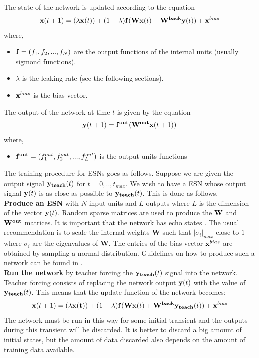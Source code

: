 \documentclass[letterpaper,9pt]{article}
\begin{document}
The state of the network is updated according to the equation
\begin{equation}
{\bf x}(t+1)= (\lambda {\bf x}(t)) + (1-\lambda){\bf f}({\bf Wx}(t) + {\bf W^{back}y}(t)) + {\bf x}^{bias}
\end{equation}
where,
\begin{itemize}
  \item ${\bf f}=(f_1,f_2,...,f_N)$ are the output functions of the internal units (usually sigmond functions).
  \item $\lambda$ is the leaking rate (see the following sections).
  \item ${\bf x}^{bias}$ is the bias vector.
\end{itemize}
The output of the network at time $t$ is given by the equation
\begin{equation}
  {\bf y}(t+1)={\bf f^{out}}({\bf W^{out}}{\bf x}(t+1))
\end{equation}
where,
\begin{itemize}
  \item ${\bf f^{out}}=(f_1^{out},f_2^{out},...,f_L^{out})$ is the output units functions
\end{itemize}
The training procedure for ESNs goes as follows. Suppose we are given the output signal ${\bf y_{teach}}(t)$ for $t=0,..,t_{max}$. We wish to have a ESN whose output signal ${\bf y}(t)$ is as close as possible to ${\bf y_{teach}}(t)$. This is done as follows.\\

{\bf Produce an ESN} with $N$ input units and $L$ outputs where $L$ is the dimension of the vector ${\bf y}(t)$. Random sparse matrices are used to produce the ${\bf W}$ and ${\bf W^{out}}$ matrices. It is important that the network has echo states \cite{JaegerESNTutorial}. The usual recommendation is to scale the internal weights {\bf W} such that $|\sigma_i |_{max}$ close to $1$ where $\sigma_i$ are the eigenvalues of {\bf W}. The entries of the bias vector ${\bf x}^{bias}$ are obtained by sampling a normal distribution. Guidelines on how to produce such a network can be found in \cite{JaegerESNTutorial}.\\

{\bf Run the network} by teacher forcing the ${\bf y_{teach}}(t)$ signal into the network. Teacher forcing consists of replacing the network output ${\bf y}(t)$ with the value of ${\bf y_{teach}}(t)$. This means that the update function of the network becomes:
\begin{equation}
  {\bf x}(t+1)= (\lambda {\bf x(t)}) + (1-\lambda){\bf f}({\bf Wx}(t) + {\bf W^{back}y_{teach}}(t)) + {\bf x}^{bias}
\end{equation}
The network must be run in this way for some initial transient and the outputs during this transient will be discarded. It is better to discard a big amount of initial states, but the amount of data discarded also depends on the amount of training data available. \pagebreak
\end{document}
